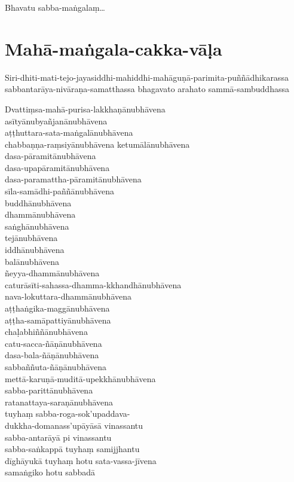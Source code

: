 Bhavatu sabba-maṅgalaṃ\ldots{}

\section{Mahā-maṅgala-cakka-vāḷa}


Siri-dhiti-mati-tejo-jayasiddhi-mahiddhi-mahāguṇā-parimita-puññādhikarassa
sabbantarāya-nivāraṇa-samatthassa bhagavato arahato sammā-sambuddhassa

Dvattiṃsa-mahā-purisa-lakkhaṇānubhāvena\\
asītyānubyañjanānubhāvena\\
aṭṭhuttara-sata-maṅgalānubhāvena\\
chabbaṇṇa-raṃsiyānubhāvena ketumālānubhāvena\\
dasa-pāramitānubhāvena\\
dasa-upapāramitānubhāvena\\
dasa-paramattha-pāramitānubhāvena\\
sīla-samādhi-paññānubhāvena\\
buddhānubhāvena\\
dhammānubhāvena\\
saṅghānubhāvena\\
tejānubhāvena\\
iddhānubhāvena\\
balānubhāvena\\
ñeyya-dhammānubhāvena\\
caturāsīti-sahassa-dhamma-kkhandhānubhāvena\\
nava-lokuttara-dhammānubhāvena\\
aṭṭhaṅgika-maggānubhāvena\\
aṭṭha-samāpattiyānubhāvena\\
chaḷabhiññānubhāvena\\
catu-sacca-ñāṇānubhāvena\\
dasa-bala-ñāṇānubhāvena\\
sabbaññuta-ñāṇānubhāvena\\
mettā-karuṇā-muditā-upekkhānubhāvena\\
sabba-parittānubhāvena\\
ratanattaya-saraṇānubhāvena\\
tuyhaṃ sabba-roga-sok'upaddava-\\ dukkha-domanass'upāyāsā vinassantu\\
sabba-antarāyā pi vinassantu\\
sabba-saṅkappā tuyhaṃ samijjhantu\\
dīghāyukā tuyhaṃ hotu sata-vassa-jīvena\\
samaṅgiko hotu sabbadā

